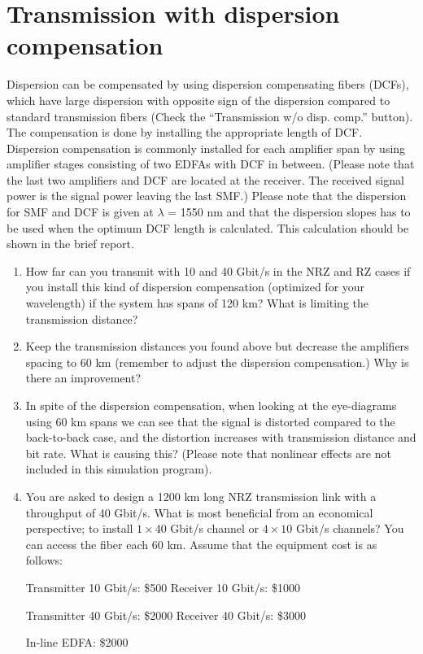 \documentclass[10pt,letterpaper]{article}
\begin{document}
\section{Transmission with dispersion compensation}
Dispersion can be compensated by using dispersion compensating fibers (DCFs), which have large dispersion with opposite sign of the dispersion compared to standard transmission fibers (Check the ``Transmission w/o disp. comp.'' button). The compensation is done by installing the appropriate length of DCF. Dispersion compensation is commonly installed for each amplifier span by using amplifier stages consisting of two EDFAs with DCF in between. (Please note that the last two amplifiers and DCF are located at the receiver. The received signal power is the signal power leaving the last SMF.)
Please note that the dispersion for SMF and DCF is given at $\lambda$ = 1550 nm and that the dispersion slopes has to be used when the optimum DCF length is calculated. This calculation should be shown in the brief report.
\begin{enumerate}
\item
How far can you transmit with 10 and 40 Gbit/s in the NRZ and RZ cases if you install this kind of dispersion compensation (optimized for your wavelength) if the system has spans of 120 km? What is limiting the transmission distance?
\item
Keep the transmission distances you found above but decrease the amplifiers spacing to 60 km (remember to adjust the dispersion compensation.) Why is there an improvement?
\item
In spite of the dispersion compensation, when looking at the eye-diagrams using 60 km spans we can see that the signal is distorted compared to the back-to-back case, and the distortion increases with transmission distance and bit rate. What is causing this? (Please note that nonlinear effects are not included in this simulation program).
\item
You are asked to design a 1200 km long NRZ transmission link with a throughput of 40 Gbit/s. What is most beneficial from an economical perspective; to install $1 \times 40$ Gbit/s channel or $4 \times 10$ Gbit/s channels? You can access the fiber each 60 km. Assume that the equipment cost is as follows:

Transmitter 10 Gbit/s: \$500 Receiver 10 Gbit/s: \$1000

Transmitter 40 Gbit/s: \$2000 Receiver 40 Gbit/s: \$3000

In-line EDFA: \$2000
\end{enumerate}
\end{document}
